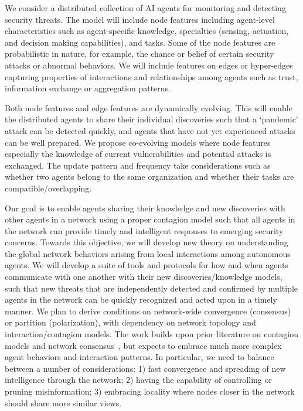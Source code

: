 \documentclass{NSF}
\begin{document}
We consider a distributed collection of AI agents for monitoring and detecting security threats.
The model will include node features including agent-level characteristics such as agent-specific knowledge, specialties (sensing, actuation, and decision making capabilities), and tasks.
Some of the node features are probabilistic in nature, for example, the chance or belief of certain security attacks or abnormal behaviors.
We will include features on edges or hyper-edges capturing properties of interactions and relationships among agents such as trust, information exchange or aggregation patterns.

Both node features and edge features are dynamically evolving.
This will enable the distributed agents to share their individual discoveries such that a `pandemic' attack can be detected quickly, and agents that have not yet experienced attacks can be well prepared.
We propose co-evolving models where node features especially the knowledge of current vulnerabilities and potential attacks is exchanged.
The update pattern and frequency take considerations such as whether two agents belong to the same organization and whether their tasks are compatible/overlapping.

Our goal is to enable agents sharing their knowledge and new discoveries with other agents in a network using a proper contagion model such that all agents in the network can provide timely and intelligent responses to emerging security concerns.
Towards this objective, we will develop new theory on understanding the global network behaviors arising from local interactions among autonomous agents.
We will develop a suite of tools and protocols for how and when agents communicate with one another with their new discoveries/knowledge models, such that new threats that are independently detected and confirmed by multiple agents in the network can be quickly recognized and acted upon in a timely manner.
We plan to derive conditions on network-wide convergence (consensus) or partition (polarization), with dependency on network topology and interaction/contagion models.
The work builds upon prior literature on contagion models and network consensus~\cite{Ghasemiesfeh:2013:CCW,gao2017engineering,ebrahimi17complex,gao19volatility,gao16general,wang22coevolution}, but expects to embrace much more complex agent behaviors and interaction patterns.
In particular, we need to balance between a number of considerations:
1) fast convergence and spreading of new intelligence through the network;
2) having the capability of controlling or pruning misinformation;
3) embracing locality where nodes closer in the network should share more similar views.
\end{document}
